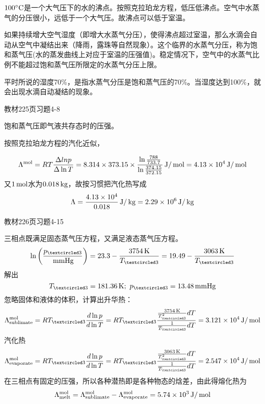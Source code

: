 \documentclass[CJK]{beamer}
\begin{document}
\begin{frame}
  \bch
  $100^\circ \mathrm{C}$是一个大气压下的水的沸点。按照克拉珀龙方程，低压低沸点。空气中水蒸气的分压很小，远低于一个大气压。故沸点可以低于室温。

  \skipline

  如果持续增大空气湿度（即增大水蒸气分压），使得沸点超过室温，那么水滴会自动从空气中凝结出来（降雨，露珠等自然现象）。这个临界的水蒸气分压，称为饱和蒸气压(水的蒸发曲线上对应于室温的压强值)。稳定情况下，空气中的水蒸气比例不能超过饱和蒸气压所限定的水蒸气分压上限。

  \skipline
  
  平时所说的湿度70\%，是指水蒸气分压是饱和蒸气压的70\%。当湿度达到100\%，就会出现水滴自动凝结的现象。
  \ech
\end{frame}

\begin{frame}
  \bch
  教材225页习题4-8
  \ech
\end{frame}


\begin{frame}
  \bch
  {\small
  饱和蒸气压即气液共存态时的压强。
  
  按照克拉珀龙方程的汽化近似，
  
  $$\Lambda^{\rm mol} = RT \frac{\Delta ln p}{\Delta \ln T} = 8.314\times 373.15 \times \frac{\ln\frac{788}{733.7}}{\ln\frac{374.15}{372.15}} \,\mathrm{J}/\,\mathrm{mol} = 4.13\times 10^4 \,\mathrm{J}/\,\mathrm{mol}$$
  又$1\,\mathrm{mol}$水为$0.018\,\mathrm{kg}$，故按习惯把汽化热写成
  $$ \Lambda = \frac{4.13\times 10^4}{0.018} \,\mathrm{J}/\,\mathrm{kg} = 2.29\times 10^6 \,\mathrm{J}/\,\mathrm{kg}$$
  }
  \ech
\end{frame}

\begin{frame}
  \bch
  教材226页习题4-15
  \ech
\end{frame}


\begin{frame}
  \bch
      {\scriptsize
        三相点既满足固态蒸气压方程，又满足液态蒸气压方程。
        $$\ln\left(\frac{\pthree}{\SImmHg}\right) = 23.3-\frac{3754\SIK}{\Tthree} = 19.49 - \frac{3063 \SIK}{\Tthree}$$
        解出
        $$\Tthree = 181.36\SIK;\ \pthree = 13.48\SImmHg$$
        忽略固体和液体的体积，计算出升华热：
        $$\Lambda^{\rm mol}_{\rm sublimate} = R\Tthree \frac{d\ln p}{d\ln T} = R\Tthree \frac{ \frac{3754\SIK }{\Tthree^2} dT }{\frac{1}{\Tthree} dT} = 3.121\times 10^4 \SIJ/\SImol $$
        汽化热
        $$\Lambda^{\rm mol}_{\rm evaporate} = R\Tthree \frac{d\ln p}{d\ln T} = R\Tthree \frac{ \frac{3063\SIK }{\Tthree^2} dT }{\frac{1}{\Tthree} dT} = 2.547\times 10^4 \SIJ/\SImol $$
        在三相点有固定的压强，所以各种潜热即是各种物态的焓差，由此得熔化热为
        $$\Lambda^{\rm mol}_{\rm melt} = \Lambda^{\rm mol}_{\rm sublimate} - \Lambda^{\rm mol}_{\rm evaporate} = 5.74 \times 10^3 \,\mathrm{J}/\,\mathrm{mol}$$
        
      }
  \ech
\end{frame}
\end{document}

